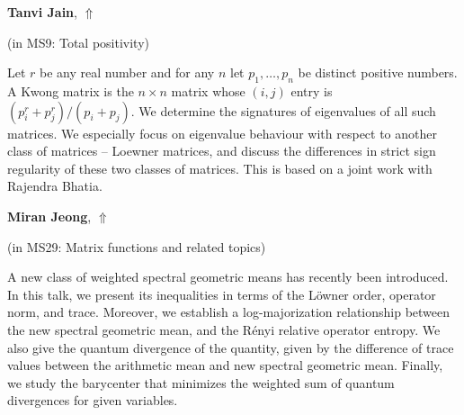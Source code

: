 \documentclass[ILAS2025-program.tex]{subfiles}
\begin{document}
\hypertarget{down0122}{}\begin{ilasabstract}
    
\textbf{Tanvi Jain},  \hfill \hyperlink{up0122}{$\Uparrow$}
    
    
(in {\color{mstitle}MS9: Total positivity})
        
\mtskip
    Let $r$ be any real number and for any $n$ let $p_1,\ldots,p_n$ be distinct positive numbers. A Kwong matrix is the $n\times n$ matrix whose $(i,j)$ entry is $(p_i^r+p_j^r)/(p_i+p_j).$ We determine the signatures of eigenvalues of all such matrices. We especially focus on eigenvalue behaviour  with respect to another class of matrices -- Loewner matrices, and discuss the differences in strict sign regularity of these two classes of matrices. This is based on a joint work with Rajendra Bhatia.
\end{ilasabstract}
    

\hypertarget{down0123}{}\begin{ilasabstract}
    
\textbf{Miran Jeong},  \hfill \hyperlink{up0123}{$\Uparrow$}
    
    
(in {\color{mstitle}MS29: Matrix functions and related topics})
        
\mtskip
    A new class of weighted spectral geometric means has recently been introduced. In this talk, we present its inequalities in terms of the L\"{o}wner order, operator
norm, and trace.
Moreover, we establish a log-majorization relationship between the new spectral geometric mean, and the R\'{e}nyi relative operator entropy.
We also give the quantum divergence of the quantity, given by the difference of trace values between the
arithmetic mean and new spectral geometric mean.
Finally, we study the barycenter that minimizes the weighted sum of quantum divergences for given variables.

\end{ilasabstract}
    
\end{document}
